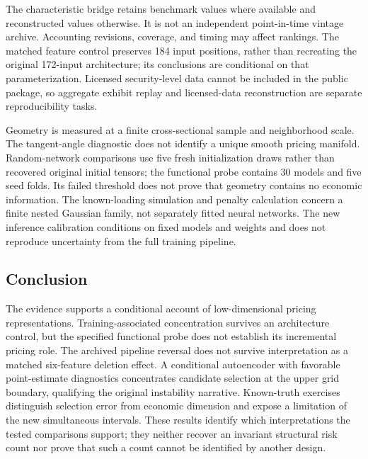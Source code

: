 The characteristic bridge retains benchmark values where available and reconstructed values otherwise. It is not an independent point-in-time vintage archive. Accounting revisions, coverage, and timing may affect rankings. The matched feature control preserves 184 input positions, rather than recreating the original 172-input architecture; its conclusions are conditional on that parameterization. Licensed security-level data cannot be included in the public package, so aggregate exhibit replay and licensed-data reconstruction are separate reproducibility tasks.

Geometry is measured at a finite cross-sectional sample and neighborhood scale. The tangent-angle diagnostic does not identify a unique smooth pricing manifold. Random-network comparisons use five fresh initialization draws rather than recovered original initial tensors; the functional probe contains 30 models and five seed folds. Its failed threshold does not prove that geometry contains no economic information. The known-loading simulation and penalty calculation concern a finite nested Gaussian family, not separately fitted neural networks. The new inference calibration conditions on fixed models and weights and does not reproduce uncertainty from the full training pipeline.

\subsection{Conclusion}

The evidence supports a conditional account of low-dimensional pricing representations. Training-associated concentration survives an architecture control, but the specified functional probe does not establish its incremental pricing role. The archived pipeline reversal does not survive interpretation as a matched six-feature deletion effect. A conditional autoencoder with favorable point-estimate diagnostics concentrates candidate selection at the upper grid boundary, qualifying the original instability narrative. Known-truth exercises distinguish selection error from economic dimension and expose a limitation of the new simultaneous intervals. These results identify which interpretations the tested comparisons support; they neither recover an invariant structural risk count nor prove that such a count cannot be identified by another design.
